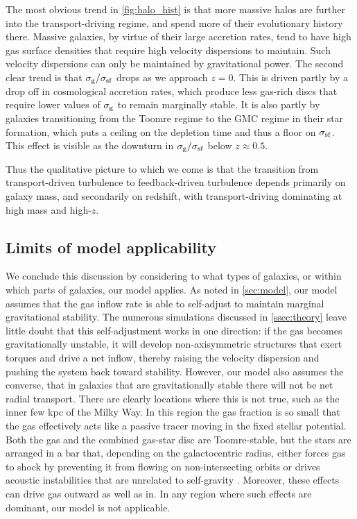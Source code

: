 \documentclass[useAMS,usenatbib]{mn2e}
\begin{document}
The most obvious trend in \autoref{fig:halo_hist} is that more massive halos are further into the transport-driving regime, and spend more of their evolutionary history there. Massive galaxies, by virtue of their large accretion rates, tend to have high gas surface densities that require high velocity dispersions to maintain. Such velocity dispersions can only be maintained by gravitational power. The second clear trend is that $\sigma_{\rm g}/\sigma_{\rm sf}$ drops as we approach $z=0$. This is driven partly by a drop off in cosmological accretion rates, which produce less gas-rich discs that require lower values of $\sigma_{\rm g}$ to remain marginally stable. It is also partly by galaxies transitioning from the Toomre regime to the GMC regime in their star formation, which puts a ceiling on the depletion time and thus a floor on $\sigma_{\rm sf}$. This effect is visible as the downturn in $\sigma_{\rm g}/\sigma_{\rm sf}$ below $z\approx 0.5$.

Thus the qualitative picture to which we come is that the transition from transport-driven turbulence to feedback-driven turbulence depends primarily on galaxy mass, and secondarily on redshift, with transport-driving dominating at high mass and high-$z$.


\subsection{Limits of model applicability}
\label{ssec:limitations}

We conclude this discussion by considering to what types of galaxies, or within which parts of galaxies, our model applies. As noted in \autoref{sec:model}, our model assumes that the gas inflow rate is able to self-adjust to maintain marginal gravitational stability. The numerous simulations discussed in \autoref{ssec:theory} leave little doubt that this self-adjustment works in one direction: if the gas becomes gravitationally unstable, it will develop non-axisymmetric structures that exert torques and drive a net inflow, thereby raising the velocity dispersion and pushing the system back toward stability. However, our model also assumes the converse, that in galaxies that are gravitationally stable there will not be net radial transport. There are clearly locations where this is not true, such as the inner few kpc of the Milky Way. In this region the gas fraction is so small that the gas effectively acts like a passive tracer moving in the fixed stellar potential. Both the gas and the combined gas-star disc are Toomre-stable, but the stars are arranged in a bar that, depending on the galactocentric radius, either forces gas to shock by preventing it from flowing on non-intersecting orbits \citep[e.g.,][]{binney91a, sormani15a} or drives acoustic instabilities that are unrelated to self-gravity \citep[e.g.,][]{montenegro99a, krumholz15d, krumholz17a}. Moreover, these effects can drive gas outward as well as in. In any region where such effects are dominant, our model is not applicable.
\end{document}
